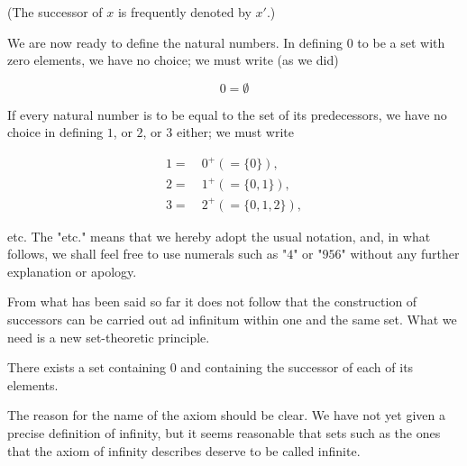 (The successor of $x$ is frequently denoted by $x'$.) 

We are now ready to define the natural numbers. In defining $0$ to be a set with zero elements, we have no choice; we must write (as we did) 

\begin{equation*}
0 = \emptyset
\end{equation*}

If every natural number is to be equal to the set of its predecessors, we have no choice in defining $1$, or $2$, or $3$ either; we must write

\begin{align*}
1 =& \: 0^{+}(= \{ 0 \} ), \\
2 =& \: 1^{+}(= \{ 0, 1 \} ), \\
3 =& \: 2^{+}(= \{ 0, 1, 2 \} ),
\end{align*}

etc. The "etc." means that we hereby adopt the usual notation, and, in what follows, we shall feel free to use numerals such as "$4$" or "$956$" without any further explanation or apology. 

From what has been said so far it does not follow that the construction of successors can be carried out ad infinitum within one and the same set. What we need is a new set-theoretic principle. 

\begin{named} There exists a set containing $0$ and containing the successor of each of its elements.
\end{named} 

The reason for the name of the axiom should be clear. We have not yet given a precise definition of infinity, but it seems reasonable that sets such as the ones that the axiom of infinity describes deserve to be called infinite.

